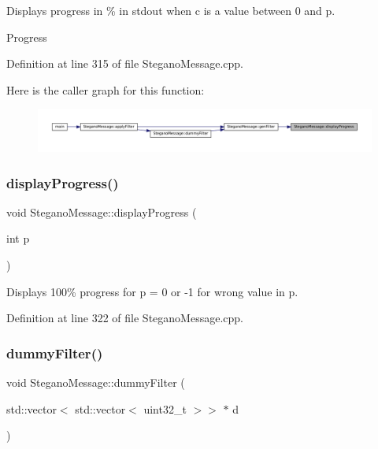 Displays progress in \% in stdout when c is a value between 0 and p. 

Progress 

Definition at line 315 of file Stegano\+Message.\+cpp.

Here is the caller graph for this function\+:\nopagebreak
\begin{figure}[H]
\begin{center}
\leavevmode
\includegraphics[width=350pt]{classSteganoMessage_a50936bb2352eaaa1112280c2ac3ca2d5_icgraph}
\end{center}
\end{figure}
\mbox{\label{classSteganoMessage_aa6e24f6ed5afcf38dcba28fb91a74d21}} 
\subsubsection{\texorpdfstring{displayProgress()}{displayProgress()}\hspace{0.1cm}{\footnotesize\ttfamily [2/2]}}
{\footnotesize\ttfamily void Stegano\+Message\+::display\+Progress (\begin{DoxyParamCaption}\item[{int}]{p }\end{DoxyParamCaption})\hspace{0.3cm}{\ttfamily [private]}}



Displays 100\% progress for p = 0 or -\/1 for wrong value in p. 



Definition at line 322 of file Stegano\+Message.\+cpp.

\mbox{\label{classSteganoMessage_a1a26242c2e6d146cba1ad6831ab60ba7}} 
\subsubsection{\texorpdfstring{dummyFilter()}{dummyFilter()}}
{\footnotesize\ttfamily void Stegano\+Message\+::dummy\+Filter (\begin{DoxyParamCaption}\item[{std\+::vector$<$ std\+::vector$<$ uint32\+\_\+t $>$$>$ $\ast$}]{d }\end{DoxyParamCaption})\hspace{0.3cm}{\ttfamily [private]}}



